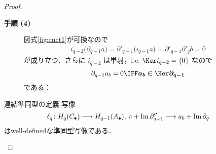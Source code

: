 \documentclass[algtopo_main]{subfiles}
\begin{document}
\begin{proof}
\begin{description}
        \begin{center}
        \end{center}

        \item[\textbf{手順 (4)}]\label{pro:4} 図式\ref{fig:cnct1}が可換なので
        \begin{align}
            i_{q-2} \bigl(\partial_{q-1} a\bigr) = \partial'_{q-1} \bigl( i_{q-1} a \bigr) = \partial'_{q-1} \partial'_q b = 0
        \end{align}
        が成り立つ．さらに $i_{q-2}$ は単射，i.e. $\Ker i_{q-2} = \{0\}$ なので
        \begin{align}
            \partial_{q-1} a_b = 0 \IFF \bm{a_b \in \Ker \partial_{q-1}}
        \end{align}
        である：

        \begin{center}
        \end{center}
    \end{description}

    \hrulefill

    \begin{mylem}[label=lem:def:connecting]{連結準同型の定義}
        写像
        \begin{align}
            \delta_q \colon H_q(C_\bullet) \longrightarrow H_{q-1} (A_\bullet),\; c + \Im \partial''_{q+1} \longmapsto a_b + \Im \partial_{q}
        \end{align}
        はwell-definedな準同型写像である．
    \end{mylem}


\end{proof}
\end{document}
